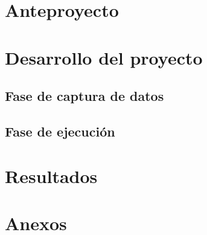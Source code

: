 \documentclass[12pt, twoside]{report}
\begin{document}




\newpage
\renewcommand{\contentsname}{\'Indice}
\tableofcontents

\newpage
\renewcommand{\listtablename}{Lista de tablas}
\listoftables

\newpage
\renewcommand{\listfigurename}{Lista de figuras}
\listoffigures

\newpage
\chapter{Anteproyecto}



%
\newpage


%
\newpage


%
\newpage


%
\newpage


%
\newpage


%
\newpage


\newpage
\chapter{Desarrollo del proyecto}

\section{Fase de captura de datos}











\newpage
\section{Fase de ejecución}







\newpage
\chapter{Resultados}

\newpage
\renewcommand{\bibname}{Referencias}



\newpage
\chapter{Anexos}\label{cap:anexos}

\end{document}
